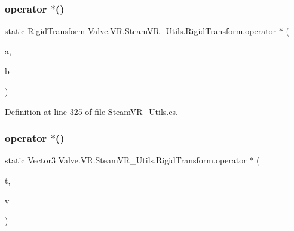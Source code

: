 \subsubsection{\texorpdfstring{operator $\ast$()}{operator *()}\hspace{0.1cm}{\footnotesize\ttfamily [1/2]}}
{\footnotesize\ttfamily static \mbox{\hyperlink{struct_valve_1_1_v_r_1_1_steam_v_r___utils_1_1_rigid_transform}{Rigid\+Transform}} Valve.\+V\+R.\+Steam\+V\+R\+\_\+\+Utils.\+Rigid\+Transform.\+operator $\ast$ (\begin{DoxyParamCaption}\item[{\mbox{\hyperlink{struct_valve_1_1_v_r_1_1_steam_v_r___utils_1_1_rigid_transform}{Rigid\+Transform}}}]{a,  }\item[{\mbox{\hyperlink{struct_valve_1_1_v_r_1_1_steam_v_r___utils_1_1_rigid_transform}{Rigid\+Transform}}}]{b }\end{DoxyParamCaption})\hspace{0.3cm}{\ttfamily [static]}}



Definition at line 325 of file Steam\+V\+R\+\_\+\+Utils.\+cs.

\mbox{\label{struct_valve_1_1_v_r_1_1_steam_v_r___utils_1_1_rigid_transform_ab1bec4ee6ae6e7efe88a659f82760b93}} 
\subsubsection{\texorpdfstring{operator $\ast$()}{operator *()}\hspace{0.1cm}{\footnotesize\ttfamily [2/2]}}
{\footnotesize\ttfamily static Vector3 Valve.\+V\+R.\+Steam\+V\+R\+\_\+\+Utils.\+Rigid\+Transform.\+operator $\ast$ (\begin{DoxyParamCaption}\item[{\mbox{\hyperlink{struct_valve_1_1_v_r_1_1_steam_v_r___utils_1_1_rigid_transform}{Rigid\+Transform}}}]{t,  }\item[{Vector3}]{v }\end{DoxyParamCaption})\hspace{0.3cm}{\ttfamily [static]}}



